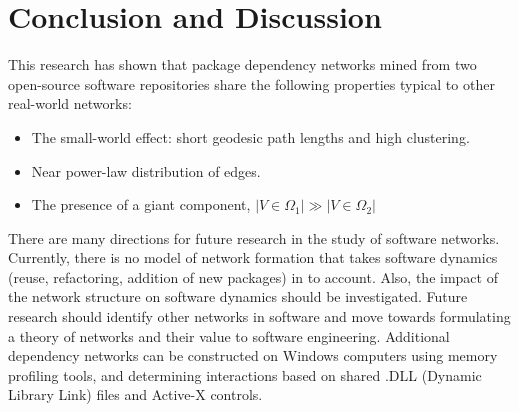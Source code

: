\documentclass{elsart}
\begin{document}
\section{Conclusion and Discussion}
This research has shown that package dependency networks mined from two open-source software repositories share the 
following properties typical to other real-world networks:
\begin{itemize}
\item The small-world effect: short geodesic path lengths and high clustering.
\item Near power-law distribution of edges.
\item The presence of a giant component, $|V \in \Omega_1| \gg |V \in \Omega_2|$
\end{itemize}
\par There are many directions for future research in the study of software networks. Currently, there is no model 
of network formation that takes software dynamics (reuse, refactoring, addition of new packages) in to account. Also, 
the impact of the network structure on software dynamics should be investigated. Future research should identify 
other networks in software and move towards formulating a theory of networks and their value to software engineering. Additional dependency networks can be constructed on Windows computers using 
memory profiling tools, and determining interactions based on shared .DLL (Dynamic Library Link) files and Active-X 
controls. 


\end{document}
